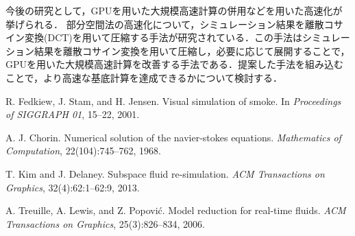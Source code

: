 \documentclass[uplatex,dvipdfmx,10pt,a4paper,notitlepage,oneside,twocolumn]{abst_jsarticle}
\begin{document}
今後の研究として，GPUを用いた大規模高速計算の併用などを用いた高速化が挙げられる．
部分空間法の高速化について，シミュレーション結果を離散コサイン変換(DCT)を用いて圧縮する手法が研究されている．この手法はシミュレーション結果を離散コサイン変換を用いて圧縮し，必要に応じて展開することで，GPUを用いた大規模高速計算を改善する手法である．提案した手法を組み込むことで，より高速な基底計算を達成できるかについて検討する．
\begin{thebibliography}{99}

R. Fedkiew, J. Stam, and H. Jensen. Visual simulation of smoke. In \textit{Proceedings of SIGGRAPH 01}, 15--22, 2001.

A. J. Chorin. Numerical solution of the navier-stokes equations. \textit{Mathematics of Computation}, 22(104):745--762, 1968.

T. Kim and J. Delaney. Subspace fluid re-simulation. \textit{ACM Transactions on Graphics}, 32(4):62:1--62:9, 2013.

A. Treuille, A. Lewis, and Z. Popovi\'{c}. Model reduction for real-time fluids. \textit{ACM Transactions on Graphics}, 25(3):826--834, 2006.


\end{thebibliography}
\end{document}

